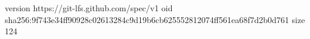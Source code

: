 version https://git-lfs.github.com/spec/v1
oid sha256:9f743e34ff90928c02613284c9d19b6cb625552812074ff561ea68f7d2b0d761
size 124
